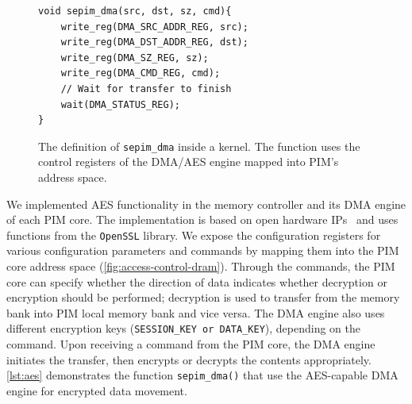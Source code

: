 \begin{figure}[t]
    \centering
    \caption{The definition of \texttt{sepim\_dma} inside a \thename kernel. The function uses the control registers of the DMA/AES engine mapped into PIM's address space.}
    \label{lst:aes}
\begin{verbatim}
void sepim_dma(src, dst, sz, cmd){
    write_reg(DMA_SRC_ADDR_REG, src); 
    write_reg(DMA_DST_ADDR_REG, dst); 
    write_reg(DMA_SZ_REG, sz); 
    write_reg(DMA_CMD_REG, cmd);
    // Wait for transfer to finish
    wait(DMA_STATUS_REG);
}
\end{verbatim}
\end{figure}



 We implemented AES functionality in the memory controller and its DMA engine of each PIM core. The implementation is based on open hardware IPs~\cite{aes-opencore,nxp} and uses functions from the \texttt{OpenSSL} library. We expose the configuration registers for various configuration parameters and commands by mapping them into the PIM core address space (\autoref{fig:access-control-dram}). Through the commands, the PIM core can specify whether the direction of data indicates whether decryption or encryption should be performed; decryption is used to transfer from the memory bank into PIM local memory bank and vice versa. The DMA engine also uses different encryption keys (\texttt{SESSION\_KEY or DATA\_KEY}), depending on the command. Upon receiving a command from the PIM core, the DMA engine initiates the transfer, then encrypts or decrypts the contents appropriately. \autoref{lst:aes} demonstrates the function \texttt{sepim\_dma()} that use  the AES-capable DMA engine for encrypted data movement.






